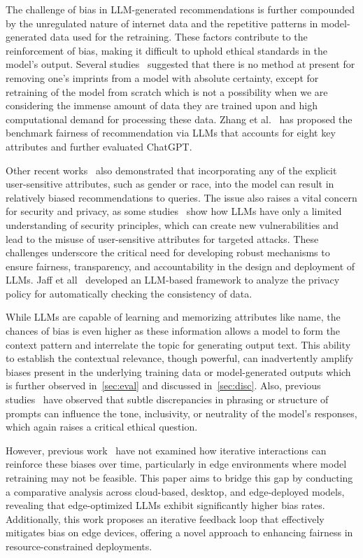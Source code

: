 The challenge of bias in LLM-generated recommendations is further compounded by the unregulated nature of internet data and the repetitive patterns in model-generated data used for the retraining. These factors contribute to the reinforcement of bias, making it difficult to uphold ethical standards in the model’s output. 
Several studies~\cite{winograd2022loose, jones2022artificial} suggested that there is no method at present for removing one’s imprints from a model with absolute certainty, except for retraining of the model from scratch which is not a possibility when we are considering the immense amount of data they are trained upon and high computational demand for processing these data.
Zhang et al.~\cite{zhang2023chatgpt} has proposed the benchmark fairness of recommendation via LLMs  that accounts for eight key attributes and further evaluated ChatGPT. 

Other recent works~\cite{deldjoo2024cfairllm, ghanbarzadeh2023gender} also demonstrated that incorporating any of the explicit user-sensitive attributes, such as gender or race, into the model can result in relatively biased recommendations to queries. The issue also raises a vital concern for security and privacy, as some studies~\cite{mohsin2024can,yao2024survey,yan2024protecting} show how LLMs have only a limited understanding of security principles, which can create new vulnerabilities and lead to the misuse of user-sensitive attributes for targeted attacks. 
These challenges underscore the critical need for developing robust mechanisms to ensure fairness, transparency, and accountability in the design and deployment of LLMs. 
Jaff et all~\cite{jaff2024data} developed an LLM-based framework to analyze the privacy policy for automatically checking the consistency of data.


While LLMs are capable of learning and memorizing attributes like name, the chances of bias is even higher as these information allows a model to form the context pattern and interrelate the topic for generating output text. This ability to establish the contextual relevance, though powerful, can inadvertently amplify biases present in the underlying training data or model-generated outputs which is further observed in~\ref{sec:eval} and discussed in~\ref{sec:disc}. 
Also, previous studies~\cite{radcliffe2024automated, metzger1999sign, nijodo2024automated, bianchi2023easily} have observed that subtle discrepancies in phrasing or structure of prompts can influence the tone, inclusivity, or neutrality of the model’s responses, which again raises a critical ethical question. 

However, previous work~\cite{taubenfeld2024systematic, ye2024justice, liang2024learning, qu2024mobile} have not examined how iterative interactions can reinforce these biases over time, particularly in edge environments where model retraining may not be feasible. 
This paper aims to bridge this gap by conducting a comparative analysis across cloud-based, desktop, and edge-deployed models, revealing that edge-optimized LLMs exhibit significantly higher bias rates. Additionally, this work proposes an iterative feedback loop that effectively mitigates bias on edge devices, offering a novel approach to enhancing fairness in resource-constrained deployments. 